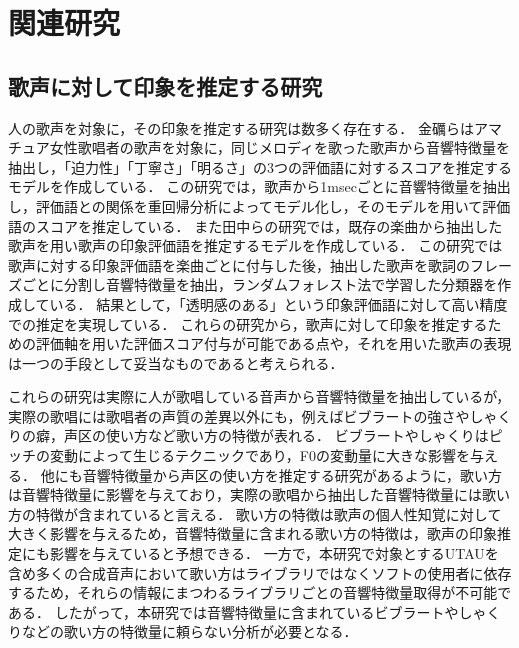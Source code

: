 \thispagestyle{myheadings}
\chapter{関連研究}
\label{sec:format}

\section{歌声に対して印象を推定する研究}
人の歌声を対象に，その印象を推定する研究は数多く存在する．
金礪らはアマチュア女性歌唱者の歌声を対象に，同じメロディを歌った歌声から音響特徴量を抽出し，「迫力性」「丁寧さ」「明るさ」の3つの評価語に対するスコアを推定するモデルを作成している\cite{impression}．
この研究では，歌声から1msecごとに音響特徴量を抽出し，評価語との関係を重回帰分析によってモデル化し，そのモデルを用いて評価語のスコアを推定している．
また田中らの研究\cite{rnd_forest}では，既存の楽曲から抽出した歌声を用い歌声の印象評価語を推定するモデルを作成している．
この研究では歌声に対する印象評価語を楽曲ごとに付与した後，抽出した歌声を歌詞のフレーズごとに分割し音響特徴量を抽出，ランダムフォレスト法で学習した分類器を作成している．
結果として，「透明感のある」という印象評価語に対して高い精度での推定を実現している．
これらの研究から，歌声に対して印象を推定するための評価軸を用いた評価スコア付与が可能である点や，それを用いた歌声の表現は一つの手段として妥当なものであると考えられる．

これらの研究は実際に人が歌唱している音声から音響特徴量を抽出しているが，実際の歌唱には歌唱者の声質の差異以外にも，例えばビブラートの強さやしゃくりの癖，声区の使い方など歌い方の特徴が表れる．
ビブラートやしゃくりはピッチの変動によって生じるテクニックであり，F0の変動量に大きな影響を与える．
他にも音響特徴量から声区の使い方を推定する研究\cite{pop_seiku}があるように，歌い方は音響特徴量に影響を与えており，実際の歌唱から抽出した音響特徴量には歌い方の特徴が含まれていると言える．
歌い方の特徴は歌声の個人性知覚に対して大きく影響を与える\cite{vibrato_monomane}\cite{monomane_tec}ため，音響特徴量に含まれる歌い方の特徴は，歌声の印象推定にも影響を与えていると予想できる．
一方で，本研究で対象とするUTAUを含め多くの合成音声において歌い方はライブラリではなくソフトの使用者に依存するため，それらの情報にまつわるライブラリごとの音響特徴量取得が不可能である．
したがって，本研究では音響特徴量に含まれているビブラートやしゃくりなどの歌い方の特徴量に頼らない分析が必要となる．

